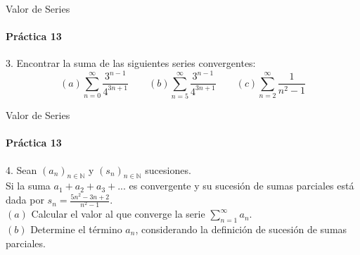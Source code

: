 \documentclass{plantillaPPT}
\begin{document}
\begin{frame}{Valor de Series}
\framesubtitle{Práctica 13}

3. Encontrar la suma de las siguientes series convergentes:
\[(a)\sum_{n=0}^{\infty}\frac{3^{n-1}}{4^{3n+1}} \qquad (b)\sum_{n=5}^{\infty}\frac{3^{n-1}}{4^{3n+1}} \qquad (c)\sum_{n=2}^{\infty}\frac{1}{n^2-1}\]
    
\end{frame}

\begin{frame}{Valor de Series}
\framesubtitle{Práctica 13}
4. Sean \((a_n)_{n\in\mathbb{N}}\) y \((s_n)_{n\in\mathbb{N}}\) sucesiones.\\[1ex]
Si la suma \(a_1+a_2+a_3+...\) es convergente y su sucesión de sumas parciales está dada por \(s_n=\frac{5n^2-3n+2}{n^2-1}\).\\[3ex]

\((a)\) Calcular el valor al que converge la serie \(\sum_{n=1}^{\infty}a_n\).\\[2ex]
\((b)\) Determine el término \(a_n\), considerando la definición de sucesión de sumas parciales.
    
\end{frame}
\end{document}
